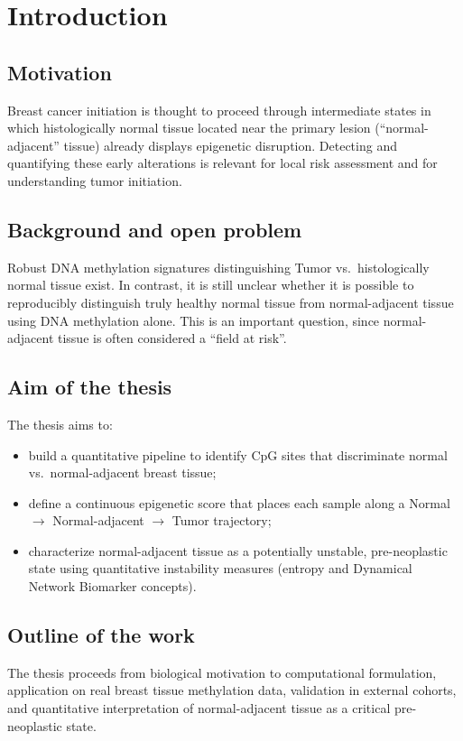 \documentclass[10pt]{extarticle}
\begin{document}
\section{Introduction}

\subsection{Motivation}
Breast cancer initiation is thought to proceed through intermediate states in which histologically normal tissue located near the primary lesion (``normal-adjacent'' tissue) already displays epigenetic disruption. Detecting and quantifying these early alterations is relevant for local risk assessment and for understanding tumor initiation.

\subsection{Background and open problem}
Robust DNA methylation signatures distinguishing Tumor vs.\ histologically normal tissue exist. In contrast, it is still unclear whether it is possible to reproducibly distinguish truly healthy normal tissue from normal-adjacent tissue using DNA methylation alone. This is an important question, since normal-adjacent tissue is often considered a ``field at risk''.

\subsection{Aim of the thesis}
The thesis aims to:
\begin{itemize}[label=-]
    \item build a quantitative pipeline to identify CpG sites that discriminate normal vs.\ normal-adjacent breast tissue;
    \item define a continuous epigenetic score that places each sample along a Normal $\rightarrow$ Normal-adjacent $\rightarrow$ Tumor trajectory;
    \item characterize normal-adjacent tissue as a potentially unstable, pre-neoplastic state using quantitative instability measures (entropy and Dynamical Network Biomarker concepts).
\end{itemize}

\subsection{Outline of the work}
The thesis proceeds from biological motivation to computational formulation, application on real breast tissue methylation data, validation in external cohorts, and quantitative interpretation of normal-adjacent tissue as a critical pre-neoplastic state.
\end{document}
